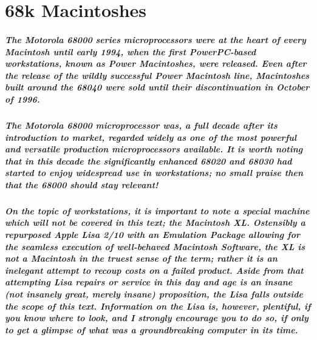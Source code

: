 
\chapter{68k Macintoshes}



\paragraph{%
The Motorola 68000 series microprocessors were at the heart of every Macintosh %
until early 1994, when the first PowerPC-based workstations, known as Power %
Macintoshes, were released. Even after the release of the wildly successful %
Power Macintosh line, Macintoshes built around the 68040 were sold until %
their discontinuation in October of 1996. %
}

\paragraph{%
The Motorola 68000 microprocessor was, a full decade after its introduction to %
market, regarded widely as one of the most powerful and versatile production %
microprocessors available. It is worth noting that in this decade the %
significantly enhanced 68020 and 68030 had started to enjoy widespread use %
in workstations; no small praise then that the 68000 should stay relevant! %
}

\paragraph{%
On the topic of workstations, it is important to note a special machine which %
will not be covered in this text; the Macintosh XL. Ostensibly a repurposed %
Apple Lisa 2/10 with an Emulation Package allowing for the seamless execution %
of well-behaved Macintosh Software, the XL is not a Macintosh in the truest %
sense of the term; rather it is an inelegant attempt to recoup costs on a %
failed product. Aside from that attempting Lisa repairs or service in this %
day and age is an insane (not insanely great, merely insane) proposition, the %
Lisa falls outside the scope of this text. Information on the Lisa is, however, %
plentiful, if you know where to look, and I strongly encourage you to do so, if %
only to get a glimpse of what was a groundbreaking computer in its time. %
}

